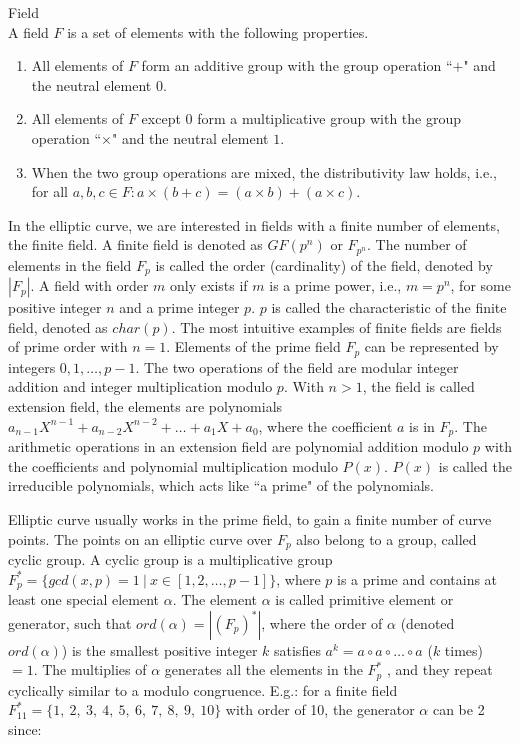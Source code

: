 \begin{mdframed}[align=center, userdefinedwidth=32em]
    \begin{definition} Field\\
    A field $F$ is a set of elements with the following properties.
    \begin{enumerate}
      \item All elements of $F$ form an additive group with the group operation ``$+$" and the neutral element $0$.
      \item All elements of $F$ except $0$ form a multiplicative group with the group operation ``$\times$" and the neutral element $1$.
      \item When the two group operations are mixed, the distributivity law holds, i.e., for all $a, b, c \in F: a \times (b+c) = (a \times b) + (a \times c)$.
    \end{enumerate}
    \end{definition}
\end{mdframed}

In the elliptic curve, we are interested in fields with a finite number of elements, the finite field. A finite field is denoted as $GF(p^n)$ or $F_{p^n}$. The number of elements in the field $F_p$ is called the order (cardinality) of the field, denoted by $|F_p|$. A field with order $m$ only exists if $m$ is a prime power, i.e., $m = p^n$, for some positive integer $n$ and a prime integer $p$. $p$ is called the characteristic of the finite field, denoted as $char(p)$. The most intuitive examples of finite fields are fields of prime order with $n = 1$. Elements of the prime field $F_p$ can be represented by integers $0, 1, \dotso , p-1$. The two operations of the field are modular integer addition and integer multiplication modulo $p$. With $n > 1$, the field is called extension field, the elements are polynomials $a_{n-1}X^{n-1} + a_{n-2}X^{n-2} + \dotso + a_1X + a_0$, where the coefficient $a$ is in $F_p$. The arithmetic operations in an extension field are polynomial addition modulo $p$ with the coefficients and polynomial multiplication modulo $P(x)$. $P(x)$ is called the irreducible polynomials, which acts like ``a prime" of the polynomials.

Elliptic curve usually works in the prime field, to gain a finite number of curve points. The points on an elliptic curve over $F_p$ also belong to a group, called cyclic group. A cyclic group is a multiplicative group $F_p^* = \{ gcd(x,p) = 1 \ | \ x \in [ 1, 2, \dotso , p-1 ] \}$, where $p$ is a prime and contains at least one special element $\alpha$. The element $\alpha$ is called primitive element or generator, such that $ord(\alpha) = |(F_p)^*|$, where the order of $\alpha$ (denoted $ord(\alpha)$) is the smallest positive integer $k$ satisfies $a^k = a \circ a \circ \dotso \circ a$ ($k$ times) $= 1$. The multiplies of $\alpha$ generates all the elements in the $F_p^*$ , and they repeat cyclically similar to a modulo congruence. E.g.: for a finite field $F_{11}^* = \{ 1, \ 2, \ 3, \ 4, \ 5, \ 6, \ 7, \ 8, \ 9, \ 10 \}$ with order of 10, the generator $\alpha$ can be 2 since:\\


